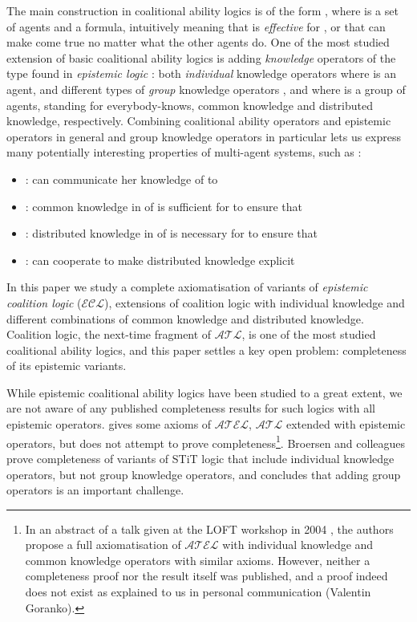 \documentclass{article}
\newcommand{\acro}[1]{\ensuremath{\mathcal{#1}}}
\begin{document}
The main construction in coalitional ability logics is of the form
, where  is a set of agents and  a formula,
intuitively meaning that  is \emph{effective} for , or that
 can make  come true no matter what the other agents do.  One
of the most studied extension of basic coalitional ability logics is
adding \emph{knowledge} operators of the type found in \emph{epistemic
  logic} \cite{Fagin1995,Meyer1995}: both \emph{individual} knowledge
operators  where  is an agent, and different types of
\emph{group} knowledge operators ,  and  where  is a
group of agents, standing for everybody-knows, common knowledge and
distributed knowledge, respectively. Combining coalitional ability
operators and epistemic operators in general and group knowledge
operators in particular lets us express many potentially interesting
properties of multi-agent systems, such as \cite{Hoek2003a}:
\begin{itemize}
\item :  can communicate her
  knowledge of  to 
\item : common knowledge in  of
   is sufficient for  to ensure that 
\item : distributed knowledge in  of
   is necessary for  to ensure that 
\item :  can cooperate to make
  distributed knowledge explicit
\end{itemize}

In this paper we study a complete axiomatisation of variants of
\emph{epistemic coalition logic} (\acro{ECL}), extensions of coalition
logic with individual knowledge and different combinations of common
knowledge and distributed knowledge. Coalition logic, the next-time
fragment of \acro{ATL}, is one of the most studied coalitional ability
logics, and this paper settles a key open problem: completeness of its
epistemic variants.

While epistemic coalitional ability logics have been studied to a
great extent, we are not aware of any published completeness results
for such logics with all epistemic operators. \cite{Hoek2003a} gives
some axioms of \acro{ATEL}, \acro{ATL} extended with epistemic
operators, but does not attempt to prove completeness\footnote{In an
  abstract of a talk given at the LOFT workshop in 2004
  \cite{goranko:2004}, the authors propose a full axiomatisation of
  \acro{ATEL} with individual knowledge and common knowledge operators
  with similar axioms. However, neither a completeness proof nor the result
  itself was published, and a proof indeed does not exist as explained
  to us in personal communication (Valentin Goranko).}.  Broersen and
colleagues \cite{BroersenDALT2008,BroersenHerzigTroquardJANCL2009}
prove completeness of variants of STiT logic that include individual
knowledge operators, but not group knowledge operators, and
\cite{BroersenHerzigTroquardJANCL2009} concludes that adding group
operators is an important challenge.
\end{document}
